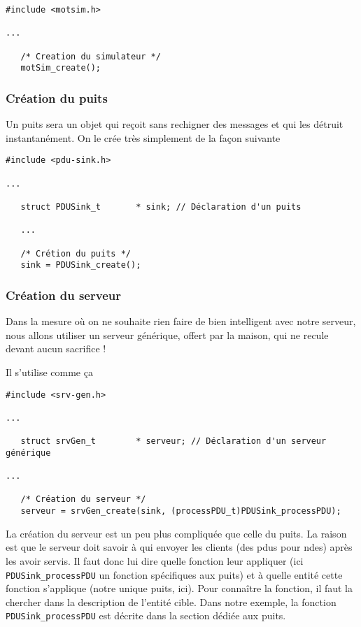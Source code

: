 \documentclass{article}
\begin{document}
\begin{verbatim}
#include <motsim.h>

...

   /* Creation du simulateur */
   motSim_create();
\end{verbatim}

\subsubsection{Création du puits}

   Un puits sera un objet qui reçoit sans rechigner des messages et
qui les détruit instantanément. On le crée très simplement de la façon
suivante

\begin{verbatim}
#include <pdu-sink.h>

...

   struct PDUSink_t       * sink; // Déclaration d'un puits

   ...

   /* Crétion du puits */
   sink = PDUSink_create();
\end{verbatim}

%
\subsubsection{Création du serveur}

   Dans la mesure où on ne souhaite rien faire de bien intelligent
avec notre serveur, nous allons utiliser un serveur générique, offert
par la maison, qui ne recule devant aucun sacrifice !

   Il s'utilise comme ça 

\begin{verbatim}
#include <srv-gen.h>

...

   struct srvGen_t        * serveur; // Déclaration d'un serveur générique

...

   /* Création du serveur */
   serveur = srvGen_create(sink, (processPDU_t)PDUSink_processPDU);
\end{verbatim}

   La création du serveur est un peu plus compliquée que celle du
puits. La raison est que le serveur doit savoir à qui envoyer les
clients (des {\sc pdu}s pour {\sc ndes}) après les avoir servis. Il
faut donc lui dire quelle fonction leur appliquer (ici {\tt
  PDUSink\_processPDU} un fonction spécifiques aux puits) et à quelle
entité cette fonction s'applique (notre unique puits, ici). Pour
connaître   la fonction, il faut la chercher dans la description de
l'entité cible. Dans notre exemple, la fonction {\tt
  PDUSink\_processPDU} est décrite dans la section dédiée aux puits.
\end{document}

